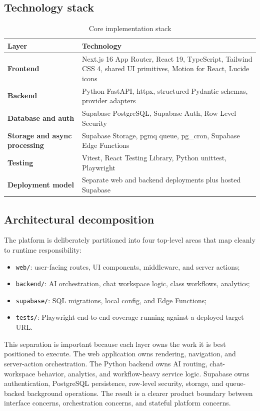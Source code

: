 \documentclass[11pt,a4paper]{article}
\begin{document}
\subsection{Technology stack}

\begin{table}[H]
\centering
\caption{Core implementation stack}
\begin{tabularx}{\textwidth}{>{\bfseries}p{3.5cm}X}
\toprule
Layer & Technology \\
\midrule
Frontend & Next.js 16 App Router, React 19, TypeScript, Tailwind CSS 4, shared UI primitives, Motion for React, Lucide icons \\
Backend & Python FastAPI, httpx, structured Pydantic schemas, provider adapters \\
Database and auth & Supabase PostgreSQL, Supabase Auth, Row Level Security \\
Storage and async processing & Supabase Storage, pgmq queue, pg\_cron, Supabase Edge Functions \\
Testing & Vitest, React Testing Library, Python unittest, Playwright \\
Deployment model & Separate web and backend deployments plus hosted Supabase \\
\bottomrule
\end{tabularx}
\end{table}

\subsection{Architectural decomposition}

The platform is deliberately partitioned into four top-level areas that map cleanly to runtime
responsibility:
\begin{itemize}
  \item \texttt{web/}: user-facing routes, UI components, middleware, and server actions;
  \item \texttt{backend/}: AI orchestration, chat workspace logic, class workflows, analytics;
  \item \texttt{supabase/}: SQL migrations, local config, and Edge Functions;
  \item \texttt{tests/}: Playwright end-to-end coverage running against a deployed target URL.
\end{itemize}

This separation is important because each layer owns the work it is best positioned to execute. The
web application owns rendering, navigation, and server-action orchestration. The Python backend
owns AI routing, chat-workspace behavior, analytics, and workflow-heavy service logic. Supabase
owns authentication, PostgreSQL persistence, row-level security, storage, and queue-backed
background operations. The result is a clearer product boundary between interface concerns,
orchestration concerns, and stateful platform concerns.
\end{document}
